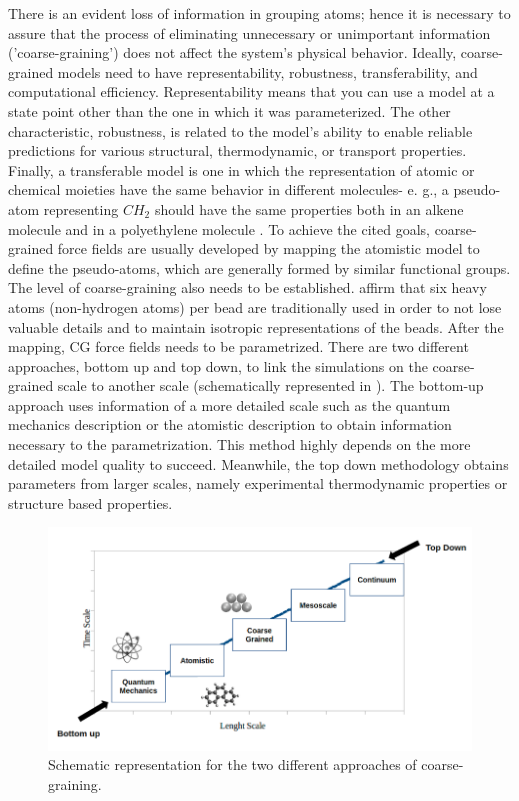 There is an evident loss of information in grouping atoms; hence it is necessary to assure that the process of eliminating unnecessary or unimportant information ('coarse-graining') does not affect the system's physical behavior. Ideally, coarse-grained models need to have representability, robustness, transferability, and computational efficiency. Representability means that you can use a model at a state point other than the one in which it was parameterized. The other characteristic, robustness, is related to the model's ability to enable reliable predictions for various structural, thermodynamic, or transport properties. Finally, a transferable model is one in which the representation of atomic or chemical moieties have the same behavior in different molecules- e. g., a pseudo-atom representing $CH_{2}$ should have the same properties both in an alkene molecule and in a polyethylene molecule     \cite{doi:10.1146/annurev-chembioeng-061312-103314}. To achieve the cited goals, coarse-grained force fields are usually developed by mapping the atomistic model to define the pseudo-atoms, which are generally formed by similar functional groups. The level of coarse-graining also needs to be established.  affirm that six heavy atoms (non-hydrogen atoms) per bead are traditionally used in order to not lose valuable details and to maintain isotropic representations of the beads. After the mapping, CG force fields needs to be parametrized. There are two different approaches, bottom up and top down, to link the simulations on the coarse-grained scale to another scale (schematically represented in ). The bottom-up approach uses information of a more detailed scale such as the quantum mechanics description or the atomistic description to obtain information necessary to the parametrization. This method highly depends on the more detailed model quality to succeed. Meanwhile, the top down methodology obtains parameters from larger scales, namely experimental thermodynamic properties or structure based properties. 

\begin{figure}[H]
	\centering
	\includegraphics[width=0.99\linewidth]{Figures/multiscale}
	\caption{Schematic representation for the two different approaches of coarse-graining.}
	\label{fig:multiscale}
\end{figure}
\FloatBarrier

